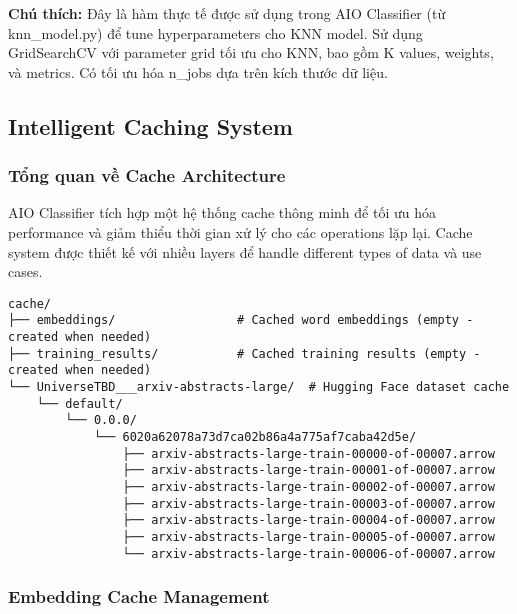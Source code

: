 \textbf{Chú thích:} Đây là hàm thực tế được sử dụng trong AIO Classifier (từ knn\_model.py) để tune hyperparameters cho KNN model. Sử dụng GridSearchCV với parameter grid tối ưu cho KNN, bao gồm K values, weights, và metrics. Có tối ưu hóa n\_jobs dựa trên kích thước dữ liệu.

\subsection{Intelligent Caching System}

\subsubsection{Tổng quan về Cache Architecture}

AIO Classifier tích hợp một hệ thống cache thông minh để tối ưu hóa performance và giảm thiểu thời gian xử lý cho các operations lặp lại. Cache system được thiết kế với nhiều layers để handle different types of data và use cases.

\begin{verbatim}
cache/
├── embeddings/                 # Cached word embeddings (empty - created when needed)
├── training_results/           # Cached training results (empty - created when needed)
└── UniverseTBD___arxiv-abstracts-large/  # Hugging Face dataset cache
    └── default/
        └── 0.0.0/
            └── 6020a62078a73d7ca02b86a4a775af7caba42d5e/
                ├── arxiv-abstracts-large-train-00000-of-00007.arrow
                ├── arxiv-abstracts-large-train-00001-of-00007.arrow
                ├── arxiv-abstracts-large-train-00002-of-00007.arrow
                ├── arxiv-abstracts-large-train-00003-of-00007.arrow
                ├── arxiv-abstracts-large-train-00004-of-00007.arrow
                ├── arxiv-abstracts-large-train-00005-of-00007.arrow
                └── arxiv-abstracts-large-train-00006-of-00007.arrow
\end{verbatim}

\subsubsection{Embedding Cache Management}

